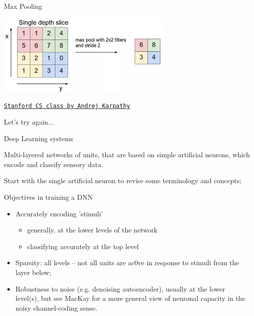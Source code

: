 \documentclass[12pt,t]{beamer}
\begin{document}
\begin{frame}[c]{Max Pooling}

\includegraphics[height=40mm]{Figs/maxpool.png}

\hfill
{\footnotesize \lolit
\href{http://cs231n.github.io/convolutional-networks/}{\tt Stanford CS class by Andrej Karpathy}
}

\end{frame}

\begin{frame}

Let's try again...

Deep Learning systems

Multi-layered networks of units, that are based on simple artificial neurons, which encode and classify sensory data.

Start with the single artificial neuron to revise some terminology and concepts;
\end{frame}


\begin{frame}

Objectives in training a DNN

\begin{itemize}

\item Accurately encoding 'stimuli'

	\begin{itemize}

	\item generally, at the lower levels of the network
	\item classifying accurately at the top level
	
	\end{itemize}

\item Sparsity: all levels – not all units are ac0ve in response to stimuli from the layer below;
\item Robustness to noise (e.g. denoising autoencoder), usually at the lower level(s), but see MacKay for a more general view of neuronal capacity in the noisy channel-coding sense.

\end{itemize}

\end{frame}
\end{document}
